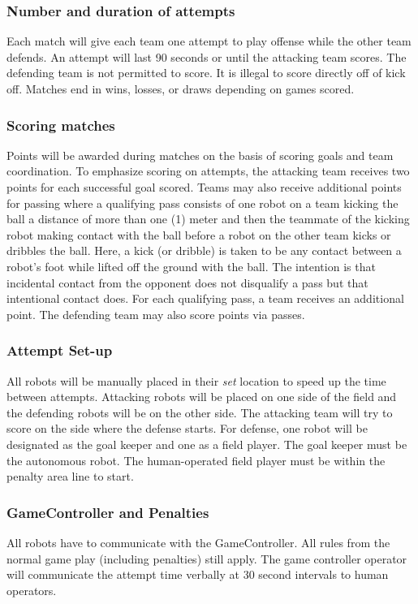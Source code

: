 \subsubsection{Number and duration of attempts}
Each match will give each team one attempt to play offense while the other team defends. An attempt will last 90 seconds or until the attacking team scores. The defending team is not permitted to score. It is illegal to score directly off of kick off. Matches end in wins, losses, or draws depending on games scored.

\subsubsection{Scoring matches}
Points will be awarded during matches on the basis of scoring goals and team coordination. To emphasize scoring on attempts, the attacking team receives two points for each successful goal scored. Teams may also receive additional points for passing where a qualifying pass consists of one robot on a team kicking the ball a distance of more than one (1) meter and then the teammate of the kicking robot making contact with the ball before a robot on the other team kicks or dribbles the ball. Here, a kick (or dribble) is taken to be any contact between a robot's foot while lifted off the ground with the ball. The intention is that  incidental contact from the opponent does not disqualify a pass but that intentional contact does. For each qualifying pass, a team receives an additional point. The defending team may also score points via passes.

\subsubsection{Attempt Set-up}
All robots will be manually placed in their \textit{set} location to speed up the time between attempts.  Attacking robots will be placed on one side of the field and the defending robots will be on the other side. The attacking team will try to score on the side where the defense starts. For defense, one robot will be designated as the goal keeper and one as a field player. The goal keeper must be the autonomous robot. The human-operated field player must be within the penalty area line to start.


\subsubsection{GameController and Penalties}
All robots have to communicate with the GameController. All rules from the normal game play (including penalties) still apply. The game controller operator will communicate the attempt time verbally at 30 second intervals to human operators.


